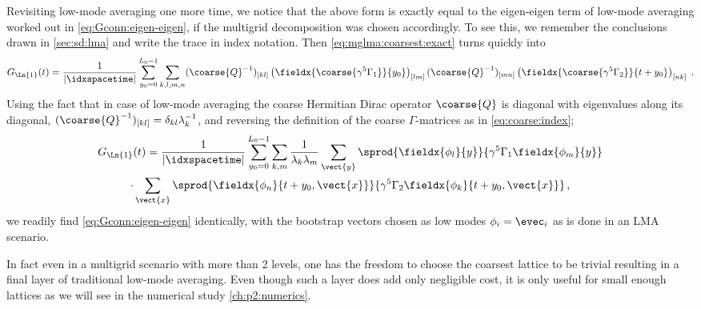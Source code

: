 Revisiting low-mode averaging one more time, we notice that the above form is exactly equal to the eigen-eigen term of low-mode averaging worked out in \cref{eq:Gconn:eigen-eigen}, if the multigrid decomposition was chosen accordingly.
To see this, we remember the conclusions drawn in \cref{sec:sd:lma} and write the trace in index notation. 
Then \cref{eq:mglma:coarsest:exact} turns quickly into
\begin{equation}
G_{\Ln{1}}(t)
= \frac{1}{\lvert \idxspacetime \rvert} \sum_{y_0=0}^{L_0-1}
\sum_{k,l,m,n}
(\coarse{Q}^{-1})_{[kl]}
\left( \fieldx{\coarse{\gamma^{5} \Gamma_1}}{y_0} \right)_{[lm]}
(\coarse{Q}^{-1})_{[mn]}
\left( \fieldx{\coarse{\gamma^{5} \Gamma_2}}{t+y_0} \right)_{[nk]} \;.
\end{equation}
Using the fact that in case of low-mode averaging the coarse Hermitian Dirac operator $\coarse{Q}$ is diagonal with eigenvalues along its diagonal, $(\coarse{Q}^{-1})_{[kl]} = \delta_{kl} \lambda_k^{-1}$, and reversing the definition of the coarse $\Gamma$-matrices as in \cref{eq:coarse:index};
\begin{multline}
G_{\Ln{1}}(t)
= \frac{1}{\lvert \idxspacetime \rvert} \sum_{y_0=0}^{L_0-1} \sum_{k,m}
\frac{1}{\lambda_k \lambda_m}
\sum_{\vect{y}}
\sprod{
	\fieldx{\phi_l}{y}
}{
	\gamma^{5}
	\Gamma_1
	\fieldx{\phi_m}{y}
} \\
\cdot \sum_{\vect{x}}
\sprod{
	\fieldx{\phi_n}{t+y_0,\vect{x}}
}{
	\gamma^{5}
	\Gamma_2
	\fieldx{\phi_k}{t+y_0,\vect{x}}
} \,,
\end{multline}
we readily find \cref{eq:Gconn:eigen-eigen} identically, with the bootstrap vectors chosen as low modes $\phi_i = \evec_i$ as is done in an LMA scenario.

In fact even in a multigrid scenario with more than \num{2} levels, one has the freedom to choose the coarsest lattice to be trivial resulting in a final layer of traditional low-mode averaging.
Even though such a layer does add only negligible cost, it is only useful for small enough lattices as we will see in the numerical study \cref{ch:p2:numerics}.

